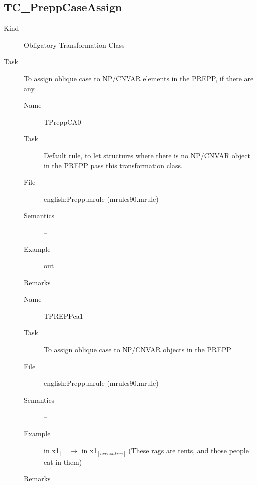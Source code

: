 \subsection{TC\_PreppCaseAssign}
\begin{description}
\item[Kind] Obligatory Transformation Class
\item[Task] To assign oblique case to NP/CNVAR elements in the PREPP, if 
there are any.

\vspace{1 cm}
\begin{description}
\item[Name] TPreppCA0
\item[Task] Default rule, to let structures where there is no NP/CNVAR object 
in the PREPP pass this transformation class.
\item[File] english:Prepp.mrule (mrules90.mrule)
\item[Semantics] --
\item[Example] out
\item[Remarks]
\end{description}

\vspace{1 cm}
\begin{description}
\item[Name] TPREPPca1
\item[Task] To assign oblique case to NP/CNVAR objects in the PREPP
\item[File] english:Prepp.mrule (mrules90.mrule)
\item[Semantics] --
\item[Example] in x1$_{[]}$ $\rightarrow$ in x1$_{[accusative]}$ (These 
rags are tents, and those people eat in them)
\item[Remarks] 
\end{description}

\end{description}

\newpage
